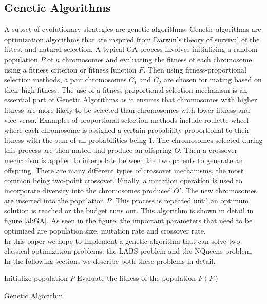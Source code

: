 \documentclass{article}
\begin{document}
\subsection{Genetic Algorithms}
A subset of evolutionary strategies are genetic algorithms. Genetic algorithms are optimization algorithms that are inspired from Darwin's theory of survival of the fittest and natural selection. A typical GA process involves initializing a random population $P$ of $n$ chromosomes and evaluating the fitness of each chromosome using a fitness criterion or fitness function $F$. Then using fitness-proportional selection methods, a pair chromosomes $C_1$ and $C_2$ are chosen for mating based on their high fitness. The use of a fitness-proportional selection mechanism is an essential part of Genetic Algorithms as it ensures that chromosomes with higher fitness are more likely to be selected than chromosomes with lower fitness and vice versa. Examples of proportional selection methods include roulette wheel where each chromosome is assigned a certain probability proportional to their fitness with the sum of all probabilities being 1. The chromosomes selected during this process are then mated and produce an offspring $O$. Then a crossover mechanism is applied to interpolate between the two parents to generate an offspring. There are many different types of crossover mechanisms, the most common being two-point crossover. Finally, a mutation operation is used to incorporate diversity into the chromosomes produced $O'$.  The new chromosomes are inserted into the population $P$. This process is repeated until an optimum solution is reached or the budget runs out. This algorithm is shown in detail in figure \ref{al:GA}.  As seen in the figure, the important parameters that need to be optimized are population size, mutation rate and crossover rate. \\
In this paper we hope to implement a genetic algorithm that can solve two classical optimization problems: the LABS problem and the NQueens problem. \\ In the following sections we describe both these problems in detail.

\begin{algorithm}[H]
\SetAlgoLined
{}

\BlankLine

Initialize population $P$\;
Evaluate the fitness of the population $F(P)$\;
\caption{Genetic Algorithm}\label{al:GA}
\end{algorithm}
\end{document}
